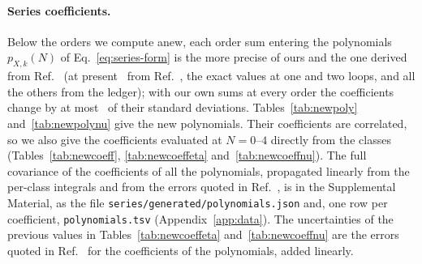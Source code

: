 \begin{table}
\caption{\label{tab:newpoly}%
Coefficients $a_j$ of the polynomials $p_{X,k}(N)=\sum_j a_j N^j$ of Eq.~(\ref{eq:series-form}) for the new and
improved terms of $\beta$ and $\eta$. Powers beyond the degree of a polynomial are left empty. The coefficients are
correlated; their covariance is in the Supplemental Material (\texttt{series/generated/polynomials.json}). Generated
from the ledger~.}
\footnotesize
\newpolybetaeta
\end{table}
\begin{table}
\caption{\label{tab:newpolynu}%
As Table~\ref{tab:newpoly}, for $\eta_{\phi^2}$ and $\nu$. The coefficient of $N^k$ in $p_{\nu,k}$ is exactly
$2^{-k-1}$, and $p_{\eta_{\phi^2},k}$ has degree $k-1$, as the limit $N\to\infty$ requires~. Generated from
the ledger~.}
\footnotesize
\newpolyphinu
\end{table}

\paragraph{Series coefficients.}
Below the orders we compute anew, each order sum entering the polynomials $p_{X,k}(N)$ of Eq.~\eqref{eq:series-form}
is the more precise of ours and the one derived from Ref.~\cite{Phi4tools2024} (at present \ from
Ref.~\cite{Phi4tools2024}, the exact values at one and two loops, and all the others from the ledger); with our own
sums at every order the coefficients change by at most \ledgeronlyzmax\ of their standard deviations.
Tables~\ref{tab:newpoly} and~\ref{tab:newpolynu} give the new polynomials. Their coefficients are correlated, so we also give the coefficients evaluated at $N=0$--$4$
directly from the classes (Tables~\ref{tab:newcoeff}, \ref{tab:newcoeffeta} and~\ref{tab:newcoeffnu}). The full
covariance of the coefficients of all the polynomials, propagated linearly from the per-class integrals and from the
errors quoted in Ref.~\cite{Phi4tools2024}, is in the Supplemental Material, as the file
\texttt{series/generated/polynomials.json} and, one row per coefficient, \texttt{polynomials.tsv}
(Appendix~\ref{app:data}). The uncertainties of the
previous values in Tables~\ref{tab:newcoeffeta} and~\ref{tab:newcoeffnu} are the errors quoted in Ref.~\cite{Phi4tools2024} for the coefficients of the
polynomials, added linearly.

